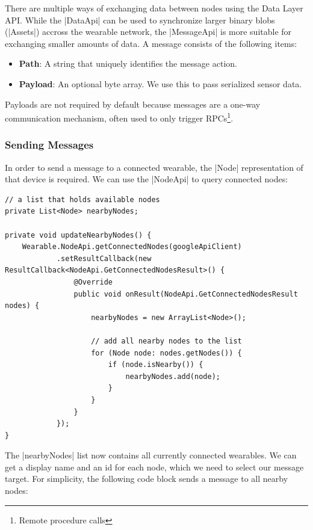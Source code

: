 There are multiple ways of exchanging data between nodes using the Data Layer API.
While the |DataApi|\cite{androiddocs:dataapi} can be used to synchronize larger binary blobs (|Assets|\cite{androiddocs:asset}) accross the wearable network, the |MessageApi|\cite{androiddocs:messageapi} is more suitable for exchanging smaller amounts of data.
A message consists of the following items:
\begin{itemize}[noitemsep]
	\item \textbf{Path}:
	A string that uniquely identifies the message action. 
	\item \textbf{Payload}:
	An optional byte array. We use this to pass serialized sensor data.
\end{itemize}
Payloads are not required by default because messages are a one-way communication mechanism, often used to only trigger RPCs\footnote{Remote procedure calls}.

\subsubsection{Sending Messages}

In order to send a message to a connected wearable, the |Node|\cite{androiddocs:node} representation of that device is required.
We can use the |NodeApi|\cite{androiddocs:nodeapi} to query connected nodes:

\begin{lstlisting}[label=nodes]
// a list that holds available nodes
private List<Node> nearbyNodes;

private void updateNearbyNodes() {
	Wearable.NodeApi.getConnectedNodes(googleApiClient)
			.setResultCallback(new ResultCallback<NodeApi.GetConnectedNodesResult>() {
				@Override
				public void onResult(NodeApi.GetConnectedNodesResult nodes) {
					nearbyNodes = new ArrayList<Node>();

					// add all nearby nodes to the list
					for (Node node: nodes.getNodes()) {
						if (node.isNearby()) {
							nearbyNodes.add(node);
						}
					}
				}
			});
}
\end{lstlisting}

The |nearbyNodes| list now contains all currently connected wearables.
We can get a display name and an id for each node, which we need to select our message target.
For simplicity, the following code block sends a message to all nearby nodes:

